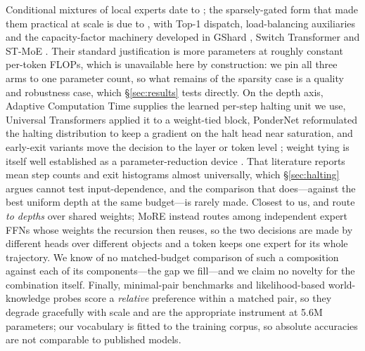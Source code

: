 Conditional mixtures of local experts date to \citet{jacobs1991moe}; the
sparsely-gated form that made them practical at scale is due to
\citet{shazeer2017moe}, with Top-1 dispatch, load-balancing auxiliaries and the
capacity-factor machinery developed in GShard \citep{lepikhin2021gshard}, Switch
Transformer \citep{fedus2022switch} and ST-MoE \citep{zoph2022stmoe}. Their
standard justification is more parameters at roughly constant per-token FLOPs,
which is unavailable here by construction: we pin all three arms to one parameter
count, so what remains of the sparsity case is a quality and robustness case,
which \S\ref{sec:results} tests directly. On the depth axis, Adaptive Computation
Time \citep{graves2016act} supplies the learned per-step halting unit we use,
Universal Transformers \citep{dehghani2019ut} applied it to a weight-tied block,
PonderNet \citep{banino2021pondernet} reformulated the halting distribution to
keep a gradient on the halt head near saturation, and early-exit variants move the
decision to the layer or token level
\citep{elbayad2020depthadaptive,schuster2022calm,raposo2024mod}; weight tying is
itself well established as a parameter-reduction device \citep{lan2020albert}.
That literature reports mean step counts and exit histograms almost universally,
which \S\ref{sec:halting} argues cannot test input-dependence, and the comparison
that does---against the best uniform depth at the same budget---is rarely made.
Closest to us, \citet{bae2025mor} and \citet{raposo2024mod} route \emph{to depths}
over shared weights; MoRE instead routes among independent expert FFNs whose
weights the recursion then reuses, so the two decisions are made by different
heads over different objects and a token keeps one expert for its whole
trajectory. We know of no matched-budget comparison of such a composition against
each of its components---the gap we fill---and we claim no novelty for the
combination itself. Finally, minimal-pair benchmarks \citep{warstadt2020blimp} and
likelihood-based world-knowledge probes \citep{ivanova2024ewok} score a
\emph{relative} preference within a matched pair, so they degrade gracefully with
scale and are the appropriate instrument at 5.6M parameters; our vocabulary is
fitted to the training corpus, so absolute accuracies are not comparable to
published models.

